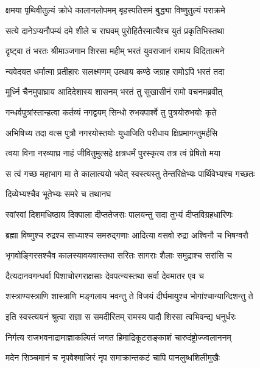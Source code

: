 \twolineshloka
{क्षमया पृथिवीतुल्यं क्रोधे कालानलोपमम्}
{बृहस्पतिसमं बुद्ध्या विष्णुतुल्यं पराक्रमे}%

\twolineshloka
{सत्ये दानेऽप्यनौपम्यं दमे शीले च राघवम्}
{पुरोहितैरमात्यैश्च युतं प्रकृतिभिस्तथा}%

\twolineshloka
{दृष्ट्वा तं भरतः श्रीमाञ्जगाम शिरसा महीम्}
{भरतं युवराजानं रामाय विदितात्मने}%

\twolineshloka
{न्यवेदयत धर्मात्मा प्रतीहारः सलक्ष्मणम्}
{उत्थाय कण्ठे जग्राह रामोऽपि भरतं तदा}%

\twolineshloka
{मूर्ध्नि चैनमुपाघ्राय आदिदेशास्य शासनम्}
{भरतं तु सुखासीनं रामो वचनमब्रवीत्}%

\twolineshloka
{गन्धर्वपुत्रांस्तान्हत्वा कर्तव्यं नगद्वयम्}
{सिन्धो रुभयपार्श्वे तु पुत्रयोरुभयोः कृते} %

\twolineshloka
{अभिषिच्य तदा वत्स पुत्रौ नगरयोस्तयोः}
{युधाजिति परीधाय क्षिप्रमागन्तुमर्हसि}%

\twolineshloka
{त्वया विना नरव्याघ्र नाहं जीवितुमुत्सहे}
{क्षत्रधर्मं पुरस्कृत्य तत्र त्वं प्रेषितो मया}%

\twolineshloka
{स त्वं गच्छ महाभाग मा ते कालात्ययो भवेत्}
{स्वस्त्यस्तु तेन्तरिक्षेभ्यः पार्थिवेभ्यश्च गच्छतः}%

\onelineshloka
{दिव्येभ्यश्चैव भूतेभ्यः समरे च तथानघ}%

\twolineshloka
{स्वांस्वां दिशमधिष्ठाय दिक्पाला दीप्ततेजसः}
{पालयन्तु सदा तुभ्यं दीप्तविग्रहधारिणः}%

\twolineshloka
{ब्रह्मा विष्णुश्च रुद्रश्च साध्याश्च समरुद्गणाः}
{आदित्या वसवो रुद्रा अश्विनौ च भिषग्वरौ}%

\twolineshloka
{भृगवोङ्गिरसश्चैव कालस्यावयवास्तथा}
{सरितः सागराः शैलाः समुद्राश्च सरांसि च}%

\twolineshloka
{दैत्यदानवगन्धर्वा पिशाचोरगराक्षसाः}
{देवपत्न्यस्तथा सर्वा देवमातर एव च}%

\twolineshloka
{शस्त्राण्यस्त्राणि शास्त्राणि मङ्गलाय भवन्तु ते}
{विजयं दीर्घमायुश्च भोगांश्चान्यान्दिशन्तु ते}%

\twolineshloka
{इति स्वस्त्ययनं श्रुत्वा राज्ञा स समदीरितम्}
{रामस्य पादौ शिरसा त्वभिवन्द्य धनुर्धरः} %

\twolineshloka
{निर्गत्य राजभवनाद्रामाज्ञाकल्पितं जगत}
{हिमाद्रिकूटसङ्काशं चारुदंष्ट्रोज्ज्वलाननम्}%

\twolineshloka
{मदेन सिञ्चमानं च नृपवेश्माजिरं नृप}
{समाक्रान्तकटं चापि पानलुब्धशिलीमुखैः}%


